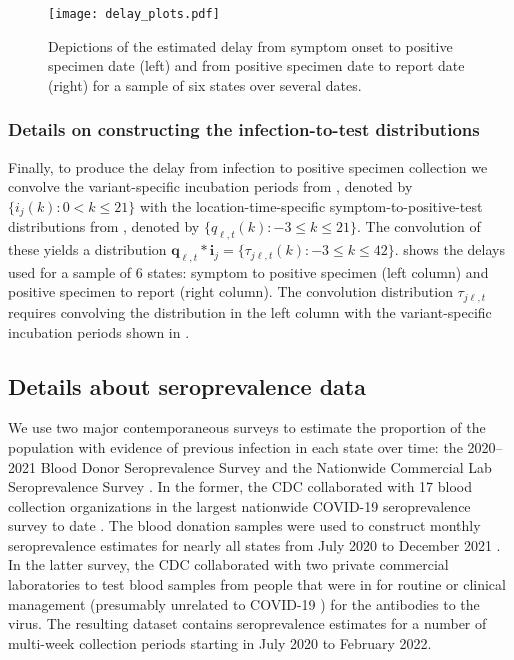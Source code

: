 \begin{figure}[t!]
\centering
    \texttt{[image: delay\_plots.pdf]} 
    \caption{Depictions of the estimated delay from symptom onset to
    positive specimen date (left) and from positive specimen date to report date
    (right) for a sample of six states over several dates.}
    \label{fig:delay-plots-samp}
\end{figure}

\subsubsection{Details on constructing the infection-to-test distributions}
\label{supp:details-conv}

Finally, to produce the delay from infection to positive specimen collection we
convolve the variant-specific incubation periods from ,
denoted by $\{i_{j}(k) : 0 < k \leq 21\}$ with the location-time-specific
symptom-to-positive-test distributions from , denoted by
$\{q_{\ell,t}(k) : -3\leq k \leq 21\}$. The convolution of these yields a
distribution $\mathbf{q}_{\ell,t}*\mathbf{i}_j = \{\tau_{j\ell,t}(k): -3 \leq k
\leq 42\}$.  shows the delays used for a sample of 6
states: symptom to positive specimen (left column) and positive specimen to report
(right column). The convolution distribution $\tau_{j\ell,t}$ requires
convolving the distribution in the left column with the variant-specific
incubation periods shown in .





\subsection{Details about seroprevalence data}
\label{supp:sero-details}

We use two major contemporaneous surveys to estimate the proportion of the
population with evidence of previous infection in each state over time: the
2020--2021 Blood Donor Seroprevalence Survey and the Nationwide Commercial Lab
Seroprevalence Survey \citep{cdc2021blood, cdc2021comm}. In the former, the CDC
collaborated with 17 blood collection organizations in the largest nationwide
COVID-19 seroprevalence survey to date \citep{cdc2021blood}. The blood donation
samples were used to construct monthly seroprevalence estimates for nearly all
states from July 2020 to December 2021 \citep{jones2021estimated}. In the latter
survey, the CDC collaborated with two private commercial laboratories to test
blood samples from people that were in for routine or clinical management
(presumably unrelated to COVID-19 \citealp{bajema2021estimated}) for the
antibodies to the virus. The resulting dataset contains seroprevalence estimates
for a number of multi-week collection periods starting in July 2020 to February
2022. 

